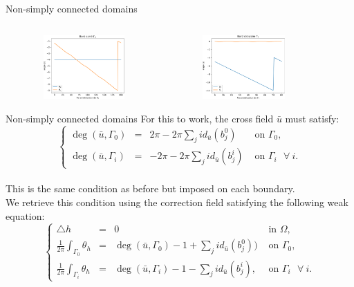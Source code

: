 \documentclass[compress,10pt,aspectratio=169]{beamer}
\begin{document}
\begin{frame}{Non-simply connected domains}
\begin{columns}
\begin{column}{0.18\textwidth}
\end{column}
\end{columns}
\vspace{0.05cm}
\centering
\includegraphics[width=6cm, height=2.45cm]{images/courbe_1.pdf}\hspace{0.6cm}
\includegraphics[width=6cm, height=2.45cm]{images/courbe_0.pdf}
\end{frame}





\begin{frame}{Non-simply connected domains}{}
\small
For this to work, the cross field $\bar{u}$ must satisfy:\\\vspace{0.2cm}
\begin{equation*}
\left\{
\begin{array}{lcll}
   \deg(\bar{u},\Gamma_0)&=&2\pi-2\pi\sum_j id_{\bar{u}}(b_j^0)&\mbox{ on }\Gamma_0,\\[0.3cm]
   \deg(\bar{u}, \Gamma_i)&=&-2\pi-2\pi\sum_j id_{\bar{u}}(b_j^i)&\mbox{ on }\Gamma_i~~~\forall~i.
\end{array}
\right.
\end{equation*}
\\\vspace{0.2cm}
{\color{onera_gray} This is the same condition as before but imposed on each boundary.}\\\vspace{0.12cm}
We retrieve this condition using the correction field satisfying the following weak equation:
\vspace{0.12cm}
\begin{equation*}
\left\{
\begin{array}{lcll}
    \triangle h &= &0 &\mbox{ in }\Omega,\\[0.25cm]
    \displaystyle\frac{1}{2\pi}\int_{\Gamma_0}\theta_h &=& \deg(\bar{u}, \Gamma_0)-1+\sum_j id_{\bar{u}}(b_j^0))&\mbox{ on } \Gamma_0,\\[0.25cm]
    \displaystyle\frac{1}{2\pi}\int_{\Gamma_i}\theta_h& =& \deg(\bar{u}, \Gamma_i)-1-\sum_j id_{\bar{u}}(b_j^i),&\mbox{ on }\Gamma_i~~~\forall~i.
\end{array}
\right.
\end{equation*}

\end{frame}
\end{document}
